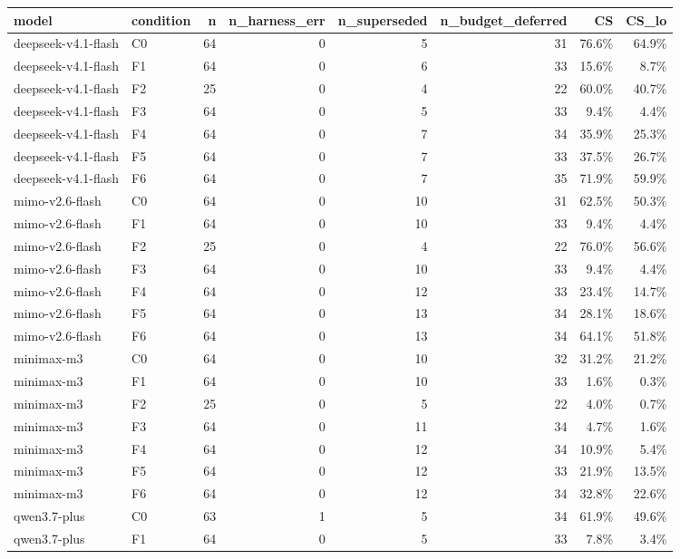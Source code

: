 \begin{tabular}{llrrrrrr}
\toprule
model & condition & n & n\_harness\_err & n\_superseded & n\_budget\_deferred & CS & CS\_lo \\
\midrule
deepseek-v4.1-flash & C0 & 64 & 0 & 5 & 31 & 76.6\% & 64.9\% \\
deepseek-v4.1-flash & F1 & 64 & 0 & 6 & 33 & 15.6\% & 8.7\% \\
deepseek-v4.1-flash & F2 & 25 & 0 & 4 & 22 & 60.0\% & 40.7\% \\
deepseek-v4.1-flash & F3 & 64 & 0 & 5 & 33 & 9.4\% & 4.4\% \\
deepseek-v4.1-flash & F4 & 64 & 0 & 7 & 34 & 35.9\% & 25.3\% \\
deepseek-v4.1-flash & F5 & 64 & 0 & 7 & 33 & 37.5\% & 26.7\% \\
deepseek-v4.1-flash & F6 & 64 & 0 & 7 & 35 & 71.9\% & 59.9\% \\
mimo-v2.6-flash & C0 & 64 & 0 & 10 & 31 & 62.5\% & 50.3\% \\
mimo-v2.6-flash & F1 & 64 & 0 & 10 & 33 & 9.4\% & 4.4\% \\
mimo-v2.6-flash & F2 & 25 & 0 & 4 & 22 & 76.0\% & 56.6\% \\
mimo-v2.6-flash & F3 & 64 & 0 & 10 & 33 & 9.4\% & 4.4\% \\
mimo-v2.6-flash & F4 & 64 & 0 & 12 & 33 & 23.4\% & 14.7\% \\
mimo-v2.6-flash & F5 & 64 & 0 & 13 & 34 & 28.1\% & 18.6\% \\
mimo-v2.6-flash & F6 & 64 & 0 & 13 & 34 & 64.1\% & 51.8\% \\
minimax-m3 & C0 & 64 & 0 & 10 & 32 & 31.2\% & 21.2\% \\
minimax-m3 & F1 & 64 & 0 & 10 & 33 & 1.6\% & 0.3\% \\
minimax-m3 & F2 & 25 & 0 & 5 & 22 & 4.0\% & 0.7\% \\
minimax-m3 & F3 & 64 & 0 & 11 & 34 & 4.7\% & 1.6\% \\
minimax-m3 & F4 & 64 & 0 & 12 & 34 & 10.9\% & 5.4\% \\
minimax-m3 & F5 & 64 & 0 & 12 & 33 & 21.9\% & 13.5\% \\
minimax-m3 & F6 & 64 & 0 & 12 & 34 & 32.8\% & 22.6\% \\
qwen3.7-plus & C0 & 63 & 1 & 5 & 34 & 61.9\% & 49.6\% \\
qwen3.7-plus & F1 & 64 & 0 & 5 & 33 & 7.8\% & 3.4\% \\

\end{tabular}
